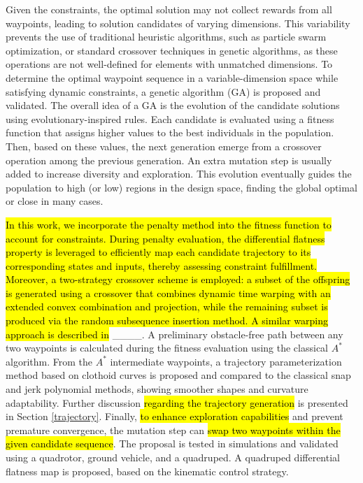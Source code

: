 Given the constraints, the optimal solution may not collect rewards from all waypoints, leading to solution candidates of varying dimensions. This variability prevents the use of traditional heuristic algorithms, such as particle swarm optimization, or standard crossover techniques in genetic algorithms, as these operations are not well-defined for elements with unmatched dimensions. To determine the optimal waypoint sequence in a variable-dimension space while satisfying dynamic constraints, a genetic algorithm (GA) is proposed and validated. The overall idea of a GA is the evolution of the candidate solutions using evolutionary-inspired rules. Each candidate is evaluated using a fitness function that assigns higher values to the best individuals in the population. Then, based on these values, the next generation emerge from a crossover operation among the previous generation. An extra mutation step is usually added to increase diversity and exploration. This evolution eventually guides the population to high (or low) regions in the design space, finding the global optimal or close in many cases.


\hl{In this work, we incorporate the penalty method into the fitness function to account for constraints. During penalty evaluation, the differential flatness property is leveraged to efficiently map each candidate trajectory to its corresponding states and inputs, thereby assessing constraint fulfillment. Moreover, a two-strategy crossover scheme is employed: a subset of the offspring is generated using a crossover that combines dynamic time warping with an extended convex combination and projection, while the remaining subset is produced via the random subsequence insertion method. A similar warping approach is described in} ____. A preliminary obstacle-free path between any two waypoints is calculated during the fitness evaluation using the classical $A^*$ algorithm. From the $A^*$ intermediate waypoints, a trajectory parameterization method based on clothoid curves is proposed and compared to the classical snap and jerk polynomial methods, showing smoother shapes and curvature adaptability. Further discussion \hl{regarding the trajectory generation} is presented in Section \ref{trajectory}. Finally, \hl{to enhance exploration capabilities} and prevent premature convergence, the mutation step can \hl{swap two waypoints within the given candidate sequence}. The proposal is tested in simulations and validated using a quadrotor, ground vehicle, and a quadruped. A quadruped differential flatness map is proposed, based on the kinematic control strategy.